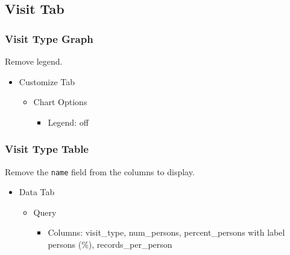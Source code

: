 \documentclass[
]{book}
\providecommand{\tightlist}{%
  \setlength{\itemsep}{0pt}\setlength{\parskip}{0pt}}
\begin{document}
\hypertarget{visit-tab-1}{%
\subsection*{Visit Tab}\label{visit-tab-1}}

\hypertarget{visit-type-graph-1}{%
\subsubsection*{Visit Type Graph}\label{visit-type-graph-1}}

Remove legend.

\begin{itemize}
\tightlist
\item
  Customize Tab

  \begin{itemize}
  \tightlist
  \item
    Chart Options

    \begin{itemize}
    \tightlist
    \item
      Legend: off
    \end{itemize}
  \end{itemize}
\end{itemize}

\hypertarget{visit-type-table-1}{%
\subsubsection*{Visit Type Table}\label{visit-type-table-1}}

Remove the \texttt{name} field from the columns to display.

\begin{itemize}
\tightlist
\item
  Data Tab

  \begin{itemize}
  \tightlist
  \item
    Query

    \begin{itemize}
    \tightlist
    \item
      Columns: visit\_type, num\_persons, percent\_persons with label persons (\%), records\_per\_person
    \end{itemize}
  \end{itemize}
\end{itemize}
\end{document}
